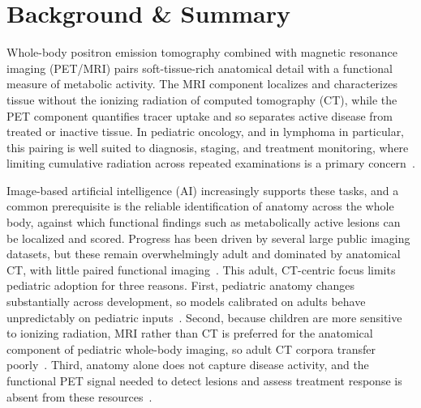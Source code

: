 
\section*{Background \& Summary}\label{sec:background}

Whole-body positron emission tomography combined with magnetic resonance imaging (PET/MRI) pairs soft-tissue-rich anatomical detail with a functional measure of metabolic activity.
The MRI component localizes and characterizes tissue without the ionizing radiation of computed tomography (CT), while the PET component quantifies tracer uptake and so separates active disease from treated or inactive tissue.
In pediatric oncology, and in lymphoma in particular, this pairing is well suited to diagnosis, staging, and treatment monitoring, where limiting cumulative radiation across repeated examinations is a primary concern~\cite{Kurch_2021,Masselli_2025}.

Image-based artificial intelligence (AI) increasingly supports these tasks, and a common prerequisite is the reliable identification of anatomy across the whole body, against which functional findings such as metabolically active lesions can be localized and scored.
Progress has been driven by several large public imaging datasets, but these remain overwhelmingly adult and dominated by anatomical CT, with little paired functional imaging~\cite{Wasserthal_2023,Gatidis_2022}.
This adult, CT-centric focus limits pediatric adoption for three reasons.
First, pediatric anatomy changes substantially across development, so models calibrated on adults behave unpredictably on pediatric inputs~\cite{Chatterjee_2025,Laborie_2026}.
Second, because children are more sensitive to ionizing radiation, MRI rather than CT is preferred for the anatomical component of pediatric whole-body imaging, so adult CT corpora transfer poorly~\cite{Brenner_2007,GalloBernal_2025}.
Third, anatomy alone does not capture disease activity, and the functional PET signal needed to detect lesions and assess treatment response is absent from these resources~\cite{Barrington_2014,Cheson_2014}.

